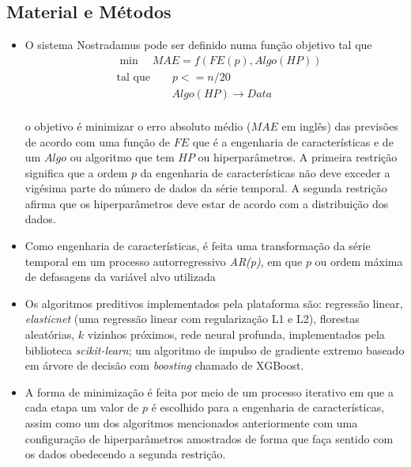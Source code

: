 \documentclass[portrait, 24pt, final]{sciposter}
\begin{document}
\begin{multicols}{2}
\section*{Material e Métodos}

\begin{itemize}
\item
	O sistema Nostradamus pode ser definido numa função objetivo tal que
\begin{equation}
    \begin{split}
        & \min \quad MAE = f(FE(p), Algo(HP)) \\
        & \text{tal que} \qquad p <= n / 20 \\
        & \qquad \qquad \quad Algo(HP) \to Data \\
    \end{split}
\end{equation}

o objetivo é minimizar o erro absoluto médio ($MAE$ em inglês) das previsões de acordo com uma função de $FE$ que é a engenharia de características e de um $Algo$ ou algoritmo que tem $HP$ ou hiperparâmetros. A primeira restrição significa que a ordem $p$ da engenharia de características não deve exceder a vigésima parte do número de dados da série temporal. A segunda restrição afirma que os hiperparâmetros deve estar de acordo com a distribuição dos dados.

\item
Como engenharia de características, é feita uma transformação da série temporal em um processo autorregressivo \textit{AR(p)}, em que $p$ ou ordem máxima de defasagens da variável alvo utilizada

\item
Os algoritmos preditivos implementados pela plataforma são: regressão linear, \textit{elasticnet} (uma regressão linear com regularização L1 e L2), florestas aleatórias, $k$ vizinhos próximos, rede neural profunda, implementados pela biblioteca \textit{scikit-learn}; um algoritmo de impulso de gradiente extremo baseado em árvore de decisão com \textit{boosting} chamado de XGBoost.

\item
A forma de minimização é feita por meio de um processo iterativo em que a cada etapa um valor de $p$ é escolhido para a engenharia de características, assim como um dos algoritmos mencionados anteriormente com uma configuração de hiperparâmetros amostrados de forma que faça sentido com os dados obedecendo a segunda restrição.


\end{itemize}
\end{multicols}
\end{document}
